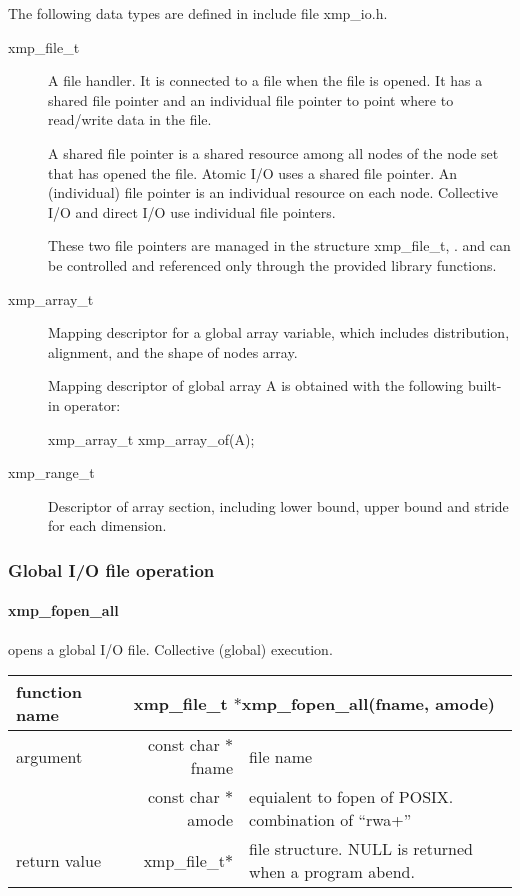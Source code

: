    The following data types are defined in include file xmp\_io.h.
   \begin{description}
    \item[xmp\_file\_t] A file handler.
	       It is connected to a file when the file is opened.
	       It has a shared file pointer and an individual file pointer
	       to point where to read/write data in the file.

	       A shared file pointer is a shared resource among all nodes of the node set
             that has opened the file. Atomic I/O uses a shared file pointer.
	       An (individual) file pointer is an individual resource on each node. 
	       Collective I/O and direct I/O use individual file pointers.
	       
	       These two file pointers are managed in the structure xmp\_file\_t, .
	       and can be controlled and referenced only through
	       the provided library functions.
    \item[xmp\_array\_t] Mapping descriptor for a global array variable,
	       which includes distribution, alignment, and the shape of nodes array.

	       Mapping descriptor of global array A is obtained with
	       the following built-in operator:
	       
	       xmp\_array\_t xmp\_array\_of(A);
\fi
    \item[xmp\_range\_t] Descriptor of array section, including
	       lower bound, upper bound and stride for each dimension.
   \end{description}

   \subsubsection{Global I/O file operation}

   \paragraph{xmp\_fopen\_all} opens a global I/O file. Collective (global) execution.
   
   \begin{table}[h]
    \begin{center}
      \begin{tabular}{|l|r|p{90mm}|}
      \hline
      {\bf function name}  & \multicolumn{2}{c|}{\bf xmp\_file\_t
      $*$xmp\_fopen\_all(fname, amode)}  \\ \hline
      argument & const char $*$fname & file name \\ \cline{2-3}
      & const char $*$amode & equialent to fopen of POSIX. combination
	      of ``rwa+'' \\ \hline
      return value & xmp\_file\_t$*$ & file structure. NULL is returned
	      when a program abend. \\ \hline
      \end{tabular}
     \end{center}
    \label{tb:aaa}
   \end{table}

